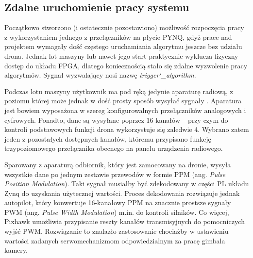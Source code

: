 \subsection{Zdalne uruchomienie pracy systemu}


Początkowo stworzono (i ostatecznie pozostawiono) możliwość rozpoczęcia pracy z wykorzystaniem jednego z przełączników na płycie PYNQ, gdyż prace nad projektem wymagały dość częstego uruchamiania algorytmu jeszcze bez udziału drona. 
Jednak lot maszyny lub nawet jego start praktycznie wyklucza fizyczny dostęp do układu FPGA, dlatego koniecznością stało się zdalne wyzwolenie pracy algorytmów. 
Sygnał wyzwalający nosi nazwę \textit{trigger\char`_algorithm}.

Podczas lotu maszyny użytkownik ma pod ręką jedynie aparaturę radiową, z poziomu której może jednak w dość prosty sposób wysyłać sygnały . %
Aparatura jest bowiem wyposażona w szereg konfigurowalnych przełączników analogowych i cyfrowych. 
Ponadto, dane są wysyłane poprzez 16 kanałów -- przy czym do kontroli podstawowych funkcji drona wykorzystuje się zaledwie 4. %
Wybrano zatem jeden z pozostałych dostępnych kanałów, któremu przypisano funkcję trzypoziomowego przełącznika obecnego na panelu urządzenia radiowego.

Sparowany z aparaturą odbiornik, który jest zamocowany na dronie, wysyła wszystkie dane po jednym zestawie przewodów w formie PPM (ang. \textit{Pulse Position Modulation}). %
Taki sygnał musiałby być zdekodowany w części PL układu Zynq do uzyskania użytecznej wartości. %
Proces dekodowania rozwiązuje jednak autopilot, który konwertuje 16-kanałowy PPM na znacznie prostsze sygnały PWM (ang. \textit{Pulse Width Modulation}) m.in. do kontroli silników. %
Co więcej, Pixhawk umożliwia przypisanie reszty kanałów transmisyjnych do pomocniczych wyjść PWM. 
Rozwiązanie to znalazło zastosowanie chociażby w ustawieniu wartości zadanych serwomechanizmom odpowiedzialnym za pracę gimbala kamery.

